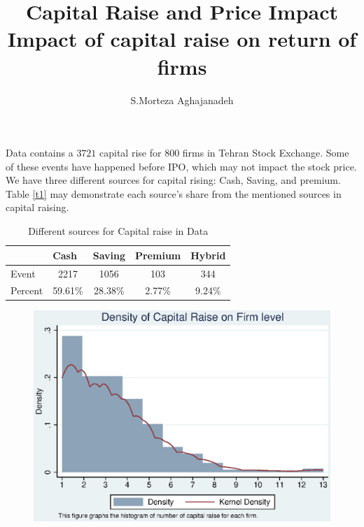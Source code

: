 \documentclass[12pt]{article}
\begin{document}
\nopagebreak
{}
\title{
 Capital Raise and Price Impact \\
  \large 
 Impact of capital raise on return of firms 
  }
\author{S.Morteza Aghajanadeh}

\nopagebreak
{\maketitle}

Data contains a $ 3721 $  capital rise for $ 800 $ firms in Tehran Stock Exchange. Some of these events have happened before IPO, which may not impact the stock price. 
We have three different sources for capital rising: Cash, Saving, and premium. Table   \ref{t1} may demonstrate each source's share from the mentioned sources in capital raising.

\begin{table}[htbp]
  \centering
  \caption{Different sources for Capital raise in Data}
\label{t1}
\begin{tabular}{l|cccc}
          & \multicolumn{1}{l}{Cash} & \multicolumn{1}{l}{Saving} & \multicolumn{1}{l}{Premium} & \multicolumn{1}{l}{Hybrid} \\
          \hline
    Event  & 2217 & 1056 & 103 & 344 \\
     Percent  & 59.61\% & 28.38\% & 2.77\% & 9.24\% 
    \end{tabular}%
  \label{tab:addlabel}%
\end{table}%






\begin{figure}
\centering
\includegraphics[width=0.7\linewidth]{Hist.eps}
\caption{}
\label{fig:Hist}
\end{figure}
\end{document}
